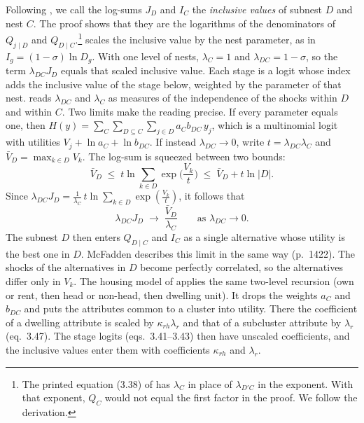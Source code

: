 Following \citet[p.~1422]{McFadden1984}, we call the log-sums $J_D$ and $I_C$ the \emph{inclusive values} of subnest
$D$ and nest $C$. The proof shows that they are the logarithms of the denominators of $Q_{j \mid D}$ and
$Q_{D \mid C}$.\footnote{The printed equation (3.38) of \citet[p.~1422]{McFadden1984} has $\lambda_C$ in place of
$\lambda_{D'C}$ in the exponent. With that exponent, $Q_C$ would not equal the first factor in the proof. We follow
the derivation.}  scales the inclusive value by the nest parameter, as in
$I_g = (1-\sigma)\ln D_g$. With one level of nests, $\lambda_C = 1$ and $\lambda_{DC} = 1 - \sigma$, so the term
$\lambda_{DC}J_D$ equals that scaled inclusive value. Each stage is a logit whose index adds the inclusive value of
the stage below, weighted by the parameter of that nest.
\citet[p.~1422]{McFadden1984} reads $\lambda_{DC}$ and $\lambda_C$ as measures of the independence of the shocks
within $D$ and within $C$. Two limits make the reading precise. If every parameter equals one, then
$H(y) = \sum_C\sum_{D \subseteq C}\sum_{j \in D} a_C b_{DC}\,y_j$, which is a multinomial logit with utilities
$V_j + \ln a_C + \ln b_{DC}$. If instead $\lambda_{DC} \to 0$, write $t = \lambda_{DC}\lambda_C$ and
$\bar V_D = \max_{k \in D} V_k$. The log-sum is squeezed between two bounds:
\[
\bar V_D \;\leq\; t\ln\sum_{k \in D}\exp\Big(\frac{V_k}{t}\Big) \;\leq\; \bar V_D + t\ln|D| .
\]
Since $\lambda_{DC}J_D = \frac{1}{\lambda_C}\,t\ln\sum_{k \in D}\exp(\frac{V_k}{t})$, it follows that
\[
\lambda_{DC}J_D \;\longrightarrow\; \frac{\bar V_D}{\lambda_C} \qquad\text{as } \lambda_{DC} \to 0 .
\]
The subnest $D$ then enters $Q_{D \mid C}$ and $I_C$ as a single alternative whose utility is the best one in $D$.
McFadden describes this limit in the same way (p.~1422). The shocks of the alternatives in $D$ become perfectly
correlated, so the alternatives differ only in $V_k$. The housing model of \citet[eqs.~3.40--3.48]{McFadden1984}
applies the same two-level recursion (own or rent, then head or non-head, then dwelling unit). It drops the
weights $a_C$ and $b_{DC}$ and puts the attributes common to a cluster into utility. There the coefficient of a
dwelling attribute is scaled by $\kappa_{rh}\lambda_r$ and that of a subcluster attribute by $\lambda_r$
(eq.~3.47). The stage logits (eqs.~3.41--3.43) then have unscaled coefficients, and the
inclusive values enter them with coefficients $\kappa_{rh}$ and $\lambda_r$.

